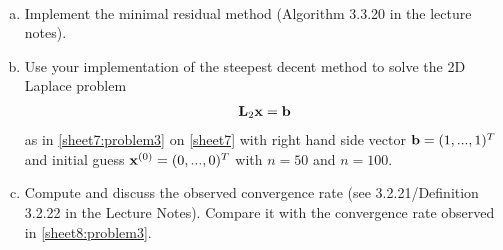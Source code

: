 \begin{Sheet}
  \begin{Problem}[Programming]
	\label{sheet8:problem4}
	\hfill\\\vspace{-6ex}
	\begin{enumerate}[(a)]
		\item Implement the minimal residual method (Algorithm 3.3.20 in the
		lecture notes).
		\item Use your implementation of the steepest decent method to
		solve the 2D Laplace problem
		\begin{gather*}
		\mathbf L_2\mathbf x=\mathbf b
		\end{gather*}
		as in \cref{sheet7:problem3} on \cref{sheet7} with right hand
		side vector $\mathbf b=(1,...,1)^T$ and initial guess
		$\mathbf x^{(0)}=(0,...,0)^T$ with $n=50$ and $n=100$. 
		\item Compute and discuss the observed convergence rate (see 3.2.21/Definition 3.2.22 in the Lecture Notes).
		Compare it with the convergence rate observed in \cref{sheet8:problem3}.
	\end{enumerate}
  \end{Problem}

  \vfill
  
  

\end{Sheet}


